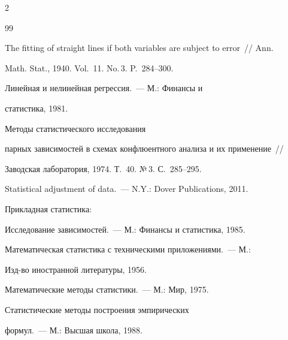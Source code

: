 \begin{multicols}{2}
\vspace*{-6pt}



{\small\frenchspacing

{%


\begin{thebibliography}{99}




 The fitting of straight lines if both variables are subject to error~// Ann.

Math. Stat., 1940. Vol.~11. No.\,3. P.~284--300.




 Линейная и нелинейная регрессия.~--- М.: Финансы и

статистика, 1981.




 Методы статистического исследования

парных зависимостей в схемах конфлюентного анализа и их применение~//

Заводская лаборатория, 1974. Т.~40. №\,3. С.~285--295.


 Statistical adjustment of data.~--- N.Y.: Dover Publications, 2011.


 Прикладная статистика:

Исследование зависимостей.~--- М.: Финансы и статистика, 1985.


 Математическая статистика с техническими приложениями.~--- М.:

Изд-во иностранной литературы, 1956.


 Математические методы статистики.~--- М.: Мир, 1975.


 Статистические методы построения эмпирических

формул.~--- М.: Высшая школа, 1988.


\end{thebibliography}}}
\end{multicols}
